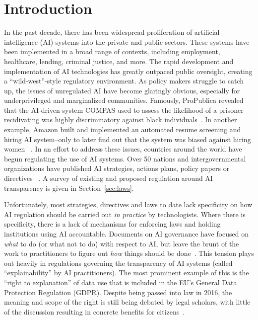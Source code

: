 \section{Introduction}
\label{sec:intro}

In the past decade, there has been widespread proliferation of artificial intelligence (AI) systems into the private and public sectors. These systems have been implemented in a broad range of contexts, including employment, healthcare, lending, criminal justice, and more. The rapid development and implementation of AI technologies has greatly outpaced public oversight, creating a ``wild-west''-style regulatory environment. As policy makers struggle to catch up, the issues of unregulated AI have become glaringly obvious, especially for underprivileged and marginalized communities. Famously, ProPublica revealed that the AI-driven system COMPAS used to assess the likelihood of a prisoner recidivating was highly discriminatory against black individuals~\cite{angwin2016machine}. In another example, Amazon  built and implemented an automated resume screening and hiring AI system--only to later find out that the system was biased against hiring women ~\cite{DBLP:journals/corr/abs-1909-03567}. In an effort to address these issues, countries around the world have begun regulating the use of AI systems. Over 50 nations and intergovernmental organizations have published AI strategies, actions plans, policy papers or directives ~\cite{unicri}. A survey of existing and proposed regulation around AI transparency is given in Section~\ref{sec:laws}.

Unfortunately, most strategies, directives and laws to date lack specificity on how AI regulation should be carried out \emph{in practice} by technologists. Where there is specificity, there is a lack of mechanisms for enforcing laws and holding institutions using AI accountable.  Documents on AI governance have focused on \emph{what} to do (or what not to do) with respect to AI, but leave the brunt of the work to practitioners to figure out \emph{how} things should be done~\cite{DBLP:journals/corr/abs-1906-11668}. This tension plays out heavily in regulations governing the transparency of AI systems (called ``explainability'' by AI practitioners). The most prominent example of this is the ``right to explanation'' of data use that is included in the EU’s General Data Protection Regulation (GDPR). Despite being passed into law in 2016, the meaning and scope of the right is still being debated by legal scholars, with little of the discussion resulting in concrete benefits for citizens~\cite{DBLP:conf/fat/SelbstP18}.

